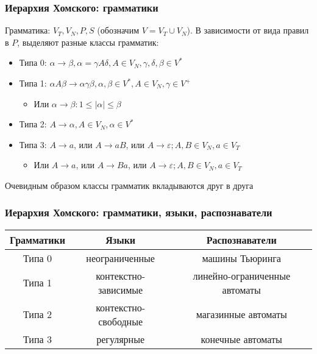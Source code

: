 \documentclass{beamer}
\begin{document}
\begin{frame}[fragile]
  \transwipe[direction=90]
  \frametitle{Иерархия Хомского: грамматики}
  Грамматика: $V_T, V_N, P, S$ (обозначим $V = V_T \cup V_N$). В зависимости от вида правил в $P$, выделяют разные классы грамматик:

  \begin{itemize}
    \item Типа 0: $\alpha \rightarrow \beta, \alpha = \gamma A \delta, A \in V_N, \gamma, \delta, \beta \in V^*$
    \item Типа 1: $\alpha A \beta \rightarrow \alpha \gamma \beta, \alpha, \beta \in V^*, A \in V_N, \gamma \in V^+$
    \begin{itemize}
      \item Или $\alpha \rightarrow \beta: 1 \leq |\alpha| \leq \beta $
    \end{itemize}
    \item Типа 2: $A \rightarrow \alpha, A \in V_N, \alpha \in V^*$
    \item Типа 3: $A \rightarrow a$, или $A \rightarrow a B$, или $A \rightarrow \varepsilon; A, B \in V_N, a \in V_T$
    \begin{itemize}
      \item Или $A \rightarrow a$, или $A \rightarrow B a$, или $A \rightarrow \varepsilon; A, B \in V_N, a \in V_T$
    \end{itemize}
  \end{itemize}

  Очевидным образом классы грамматик вкладываются друг в друга


\end{frame}


\begin{frame}[fragile]
  \transwipe[direction=90]
  \frametitle{Иерархия Хомского: грамматики, языки, распознаватели}
\begin{center}
\begin{tabular}{ c | c | c }
  Грамматики & Языки & Распознаватели \\ \hline \hline
  Типа 0 & неограниченные & машины Тьюринга \\ \hline
  Типа 1 & контекстно-зависимые & линейно-ограниченные автоматы \\ \hline
  Типа 2 & контекстно-свободные & магазинные автоматы \\ \hline
  Типа 3 & регулярные & конечные автоматы

\end{tabular}
\end{center}

\end{frame}
\end{document}
